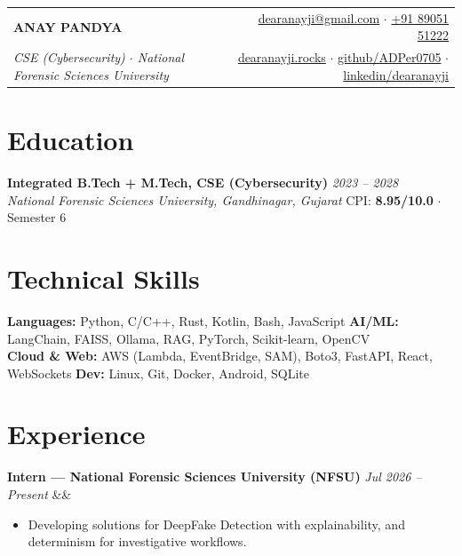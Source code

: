 \documentclass[9pt,a4paper]{extarticle}
\newcommand{\cventry}[3]{%
  \noindent\textbf{#1} \hfill \textit{\small #2}%
  \ifx&#3&\else\\\textit{\small\color{gray}#3}\fi%
}
\begin{document}
\noindent
\begin{tabularx}{\linewidth}{@{}Xr@{}}
  {\LARGE\bfseries\color{accent} ANAY PANDYA} &
  {\footnotesize
    \href{mailto:dearanayji@gmail.com}{dearanayji@gmail.com} $\cdot$
    \href{tel:+918905151222}{+91 89051 51222}
  } \\
  {\small\textit{CSE (Cybersecurity) $\cdot$ National Forensic Sciences University}} &
  {\footnotesize
    \href{https://dearanayji.rocks}{dearanayji.rocks} $\cdot$
    \href{https://github.com/ADPer0705}{github/ADPer0705} $\cdot$
    \href{https://linkedin.com/in/dearanayji}{linkedin/dearanayji}
  }
\end{tabularx}
\vspace{-2pt}

\section{Education}
\noindent\textbf{Integrated B.Tech + M.Tech, CSE (Cybersecurity)} \hfill \textit{2023 -- 2028} \\
{\small\textit{National Forensic Sciences University, Gandhinagar, Gujarat}} \hfill {\small CPI: \textbf{8.95/10.0} $\cdot$ Semester 6}

\section{Technical Skills}

{\small
\noindent\textbf{Languages:} Python, C/C++, Rust, Kotlin, Bash, JavaScript \hfill
\textbf{AI/ML:} LangChain, FAISS, Ollama, RAG, PyTorch, Scikit-learn, OpenCV \\[1pt]
\noindent\textbf{Cloud \& Web:} AWS (Lambda, EventBridge, SAM), Boto3, FastAPI, React, WebSockets \hfill
\textbf{Dev:} Linux, Git, Docker, Android, SQLite
}

\section{Experience}

\cventry{Intern --- National Forensic Sciences University (NFSU)}{Jul 2026 -- Present}{}
\begin{itemize}
  \item[\small$\bullet$] {\small Developing solutions for DeepFake Detection with explainability, and determinism for investigative workflows.}
\end{itemize}
\end{document}
